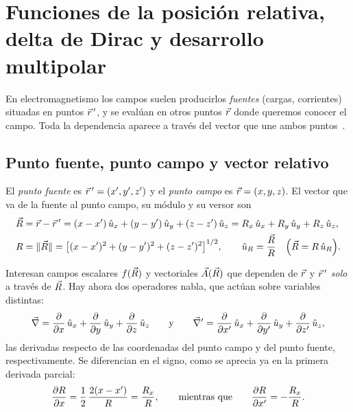 \section{Funciones de la posición relativa, delta de Dirac y desarrollo multipolar}\label{sec:posicion}
En electromagnetismo los campos suelen producirlos \emph{fuentes} (cargas,
corrientes) situadas en puntos $\vec{r}\,'$, y se evalúan en otros puntos
$\vec{r}$ donde queremos conocer el campo. Toda la dependencia aparece a través
del vector que une ambos puntos~\cite{FORMULARIO,GRIFFITHS}.

\subsection{Punto fuente, punto campo y vector relativo}\label{sec:relativa}
\begin{definicion}\label{def:relativa}
El \emph{punto fuente} es $\vec{r}\,'=(x',y',z')$ y el \emph{punto campo} es
$\vec{r}=(x,y,z)$. El vector que va de la fuente al punto campo, su módulo y su
versor son
\begin{align}
  \vec{R}&=\vec{r}-\vec{r}\,'=(x-x')\,\hat{u}_{x}+(y-y')\,\hat{u}_{y}+(z-z')\,\hat{u}_{z}=R_x\,\hat{u}_{x}+R_y\,\hat{u}_{y}+R_z\,\hat{u}_{z},\label{eq:R-vec}\\
  R&=\lVert \vec{R}\rVert=\bigl[(x-x')^{2}+(y-y')^{2}+(z-z')^{2}\bigr]^{1/2},\qquad
  \hat{u}_{R}=\frac{\vec{R}}{R}\quad\Bigl(\vec{R}=R\,\hat{u}_{R}\Bigr).\label{eq:R-mod}
\end{align}
\end{definicion}



Interesan campos escalares $f(\vec{R})$ y vectoriales $\vec{A}(\vec{R})$ que dependen
de $\vec{r}$ y $\vec{r}\,'$ \emph{solo} a través de $\vec{R}$. Hay ahora dos
operadores nabla, que actúan sobre variables distintas:
\begin{equation}\label{eq:nabla-nabla-prima}
  \vec{\nabla}=\frac{\partial }{\partial x}\,\hat{u}_{x}+\frac{\partial }{\partial y}\,\hat{u}_{y}+\frac{\partial }{\partial z}\,\hat{u}_{z}
  \qquad\text{y}\qquad
  \vec{\nabla}'=\frac{\partial }{\partial x'}\,\hat{u}_{x}+\frac{\partial }{\partial y'}\,\hat{u}_{y}+\frac{\partial }{\partial z'}\,\hat{u}_{z} ,
\end{equation}
las derivadas respecto de las coordenadas del punto campo y del punto fuente,
respectivamente. Se diferencian en el signo, como se aprecia ya en la primera
derivada parcial:
\begin{equation}\label{eq:dR}
  \frac{\partial R}{\partial x}=\frac{1}{2}\,\frac{2(x-x')}{R}=\frac{R_x}{R},
  \qquad\text{mientras que}\qquad
  \frac{\partial R}{\partial x'}=-\frac{R_x}{R}.
\end{equation}

